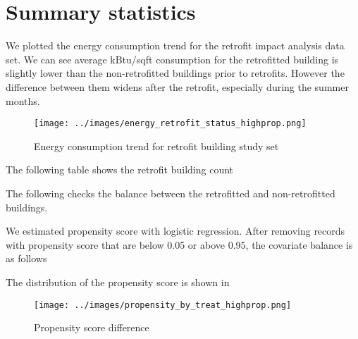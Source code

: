 \documentclass[12pt]{article}
\begin{document}
\section{Summary statistics}


We plotted the energy consumption trend for the retrofit impact analysis data
set. We can see average kBtu/sqft consumption for the retrofitted building is
slightly lower than the non-retrofitted buildings prior to retrofits. However
the difference between them widens after the retrofit, especially during the
summer months.

\begin{figure}[H]
  \centering
  \texttt{[image: ../images/energy\_retrofit\_status\_highprop.png]}
  \caption[Energy trend retrofit study]{Energy consumption trend for retrofit
    building study set}
  \label{fig:energy_retrofit_status}
\end{figure}

The following table shows the retrofit building count


The following checks the balance between the retrofitted and non-retrofitted buildings.




We estimated propensity score with logistic regression. After removing
records with propensity score that are below 0.05 or above 0.95, the covariate
balance is as follows




The distribution of the propensity score is shown in 

\begin{figure}[H]
  \centering
  \texttt{[image: ../images/propensity\_by\_treat\_highprop.png]}
  \caption[Propensity score distribution]{Propensity score difference}
  \label{fig:propensity}
\end{figure}
\end{document}
